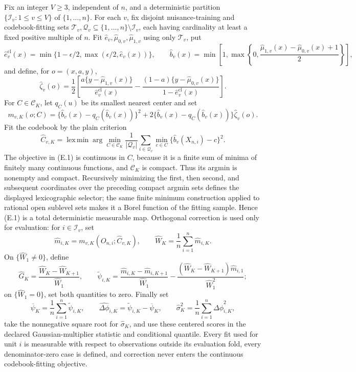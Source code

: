 Fix an integer \(V\geq3\), independent of \(n\), and a deterministic partition \(\{\mathcal I_v:1\leq v\leq V\}\) of \(\{1,\ldots,n\}\).  For each \(v\), fix disjoint nuisance-training and codebook-fitting sets \(\mathcal T_v,\mathcal Q_v\subseteq\{1,\ldots,n\}\setminus\mathcal I_v\), each having cardinality at least a fixed positive multiple of \(n\).  Fit \(\widehat e_v,\widehat\mu_{0,v},\widehat\mu_{1,v}\) using only \(\mathcal T_v\), put
\[
 \widehat e_v^{\mathrm{cl}}(x)=\min\{1-\epsilon/2,\max(\epsilon/2,\widehat e_v(x))\},
 \qquad
 \widehat b_v(x)=\min\!\left[1,\max\!\left\{0,
 \frac{\widehat\mu_{1,v}(x)-\widehat\mu_{0,v}(x)+1}{2}\right\}\right],
\]
and define, for \(o=(x,a,y)\),
\[
 \widehat\zeta_v(o)=\frac12\left[
 \frac{a\{y-\widehat\mu_{1,v}(x)\}}{\widehat e_v^{\mathrm{cl}}(x)}
 -\frac{(1-a)\{y-\widehat\mu_{0,v}(x)\}}{1-\widehat e_v^{\mathrm{cl}}(x)}\right].
\]
For \(C\in\mathcal C_K\), let \(q_C(u)\) be its smallest nearest center and set
\[
 m_{v,K}(o;C)=\{\widehat b_v(x)-q_C(\widehat b_v(x))\}^2
 +2\{\widehat b_v(x)-q_C(\widehat b_v(x))\}\widehat\zeta_v(o).
\]
Fit the codebook by the plain criterion
\[
 \widehat C_{v,K}
 =\operatorname*{lex\,min}\arg\min_{C\in\mathcal C_K}
 \frac1{|\mathcal Q_v|}\sum_{i\in\mathcal Q_v}
 \min_{c\in C}\{\widehat b_v(X_{n,i})-c\}^2.                                  \tag{E.1}
\]
The objective in (E.1) is continuous in \(C\), because it is a finite sum of minima of finitely many continuous functions, and \(\mathcal C_K\) is compact.  Thus its argmin is nonempty and compact.  Recursively minimizing the first, then second, and subsequent coordinates over the preceding compact argmin sets defines the displayed lexicographic selector; the same finite minimum construction applied to rational open sublevel sets makes it a Borel function of the fitting sample.  Hence (E.1) is a total deterministic measurable map.  Orthogonal correction is used only for evaluation: for \(i\in\mathcal I_v\), set
\[
 \widehat m_{i,K}=m_{v,K}(O_{n,i};\widehat C_{v,K}),
 \qquad
 \widehat W_K=\frac1n\sum_{i=1}^n\widehat m_{i,K}.
\]
On \(\{\widehat W_1\neq0\}\), define
\[
 \widehat G_K=\frac{\widehat W_K-\widehat W_{K+1}}{\widehat W_1},
 \qquad
 \widetilde\psi_{i,K}=
 \frac{\widehat m_{i,K}-\widehat m_{i,K+1}}{\widehat W_1}
 -\frac{(\widehat W_K-\widehat W_{K+1})\widehat m_{i,1}}{\widehat W_1^2};
\]
on \(\{\widehat W_1=0\}\), set both quantities to zero.  Finally set
\[
 \overline\psi_K=\frac1n\sum_{i=1}^n\widetilde\psi_{i,K},\qquad
 \widehat{\Delta\phi}_{i,K}=\widetilde\psi_{i,K}-\overline\psi_K,\qquad
 \widehat\sigma_K^2=\frac1n\sum_{i=1}^n\widehat{\Delta\phi}_{i,K}^2,
\]
take the nonnegative square root for \(\widehat\sigma_K\), and use these centered scores in the declared Gaussian-multiplier statistic and conditional quantile.  Every fit used for unit \(i\) is measurable with respect to observations outside its evaluation fold, every denominator-zero case is defined, and correction never enters the continuous codebook-fitting objective.